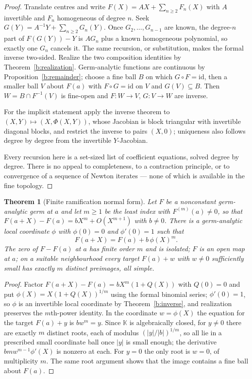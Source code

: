 \documentclass[11pt,a4paper]{article}
\numberwithin{equation}{section}
\newtheorem{theorem}{Theorem}[section]
\theoremstyle{definition}
\theoremstyle{remark}
\theoremstyle{plain}
\newcommand{\K}{\mathbb K}
\newcommand{\abs}[1]{\lvert #1\rvert}
\begin{document}
\begin{proof}
Translate centres and write $F(X)=AX+\sum_{n\ge2}F_n(X)$ with $A$
invertible and $F_n$ homogeneous of degree $n$. Seek
$G(Y)=A^{-1}Y+\sum_{n\ge2}G_n(Y)$. Once $G_2,\ldots,G_{n-1}$ are known,
the degree-$n$ part of $F(G(Y))-Y$ is $AG_n$ plus a known homogeneous
polynomial, so exactly one $G_n$ cancels it. The same recursion, or
substitution, makes the formal inverse two-sided. Realize the two
composition identities by Theorem~\ref{b:realization}. Germ-analytic
functions are continuous by Proposition~\ref{b:remainder}; choose a fine
ball $B$ on which $G\circ F=\mathrm{id}$, then a smaller ball $V$ about $F(a)$ with
$F\circ G=\mathrm{id}$ on $V$ and $G(V)\subseteq B$. Then $W=B\cap F^{-1}(V)$ is
fine-open and $F:W\to V$, $G:V\to W$ are inverse.

For the implicit statement apply the inverse theorem to
$(X,Y)\mapsto(X,\Phi(X,Y))$, whose Jacobian is block triangular with
invertible diagonal blocks, and restrict the inverse to pairs $(X,0)$;
uniqueness also follows degree by degree from the invertible
$Y$-Jacobian.

Every recursion here is a set-sized list of coefficient equations, solved
degree by degree. There is no appeal to completeness, to a contraction
principle, or to convergence of a sequence of Newton iterates --- none of
which is available in the fine topology.
\end{proof}

\begin{theorem}[Finite ramification normal form]
\label{b:ramification}
Let $F$ be a nonconstant germ-analytic germ at $a$ and let $m\ge1$ be the
least index with $F^{(m)}(a)\ne0$, so that
$F(a+X)-F(a)=bX^{m}+O(X^{m+1})$ with $b\ne0$. There is a germ-analytic
local coordinate $\phi$ with $\phi(0)=0$ and $\phi'(0)=1$ such that
\begin{equation}
\label{b:eq-ramification}
 F(a+X)=F(a)+b\,\phi(X)^{m}.
\end{equation}
The zero of $F-F(a)$ at $a$ has finite order $m$ and is isolated; $F$ is an
open map at $a$; on a suitable neighbourhood every target
$F(a)+w$ with $w\ne0$ sufficiently small has exactly $m$ distinct
preimages, all simple.
\end{theorem}

\begin{proof}
Factor $F(a+X)-F(a)=bX^{m}(1+Q(X))$ with $Q(0)=0$ and put
$\phi(X)=X(1+Q(X))^{1/m}$ using the formal binomial series; $\phi'(0)=1$,
so $\phi$ is an invertible local coordinate by Theorem~\ref{b:inverse},
and realization preserves the $m$th-power identity. In the coordinate
$w=\phi(X)$ the equation for the target $F(a)+y$ is $bw^{m}=y$. Since $\K$
is algebraically closed, for $y\ne0$ there are exactly $m$ distinct roots,
each of modulus $(\abs y/\abs b)^{1/m}$, so all lie in a prescribed small
coordinate ball once $\abs y$ is small enough; the derivative
$bmw^{m-1}\phi'(X)$ is nonzero at each. For $y=0$ the only root is $w=0$,
of multiplicity $m$. The same root argument shows that the image contains
a fine ball about $F(a)$.
\end{proof}
\end{document}

